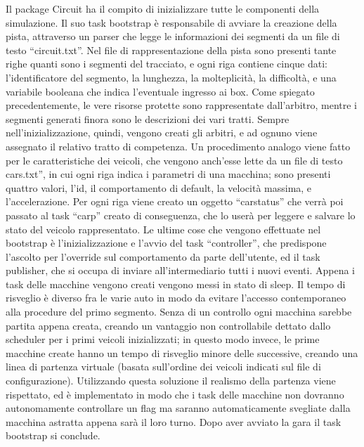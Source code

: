 Il package Circuit ha il compito di inizializzare tutte le componenti della simulazione. 
Il suo task bootstrap è responsabile di avviare la creazione della pista, attraverso un parser che legge le informazioni dei segmenti da un file di testo “circuit.txt”. Nel file di rappresentazione della pista sono presenti tante righe quanti sono i segmenti del tracciato, e ogni riga contiene cinque dati: l’identificatore del segmento, la lunghezza, la molteplicità, la difficoltà, e una variabile booleana che indica l’eventuale ingresso ai box.
Come spiegato precedentemente, le vere risorse protette sono rappresentate dall’arbitro, mentre i segmenti generati finora sono le descrizioni dei vari tratti. Sempre nell’inizializzazione, quindi, vengono creati gli arbitri, e ad ognuno viene assegnato il relativo tratto di competenza.
Un procedimento analogo viene fatto per le caratteristiche dei veicoli, che vengono anch’esse lette da un file di testo cars.txt”, in cui ogni riga indica i parametri di una macchina; sono presenti quattro valori, l’id, il comportamento di default, la velocità massima, e l’accelerazione.
Per ogni riga viene creato un oggetto ``car\textunderscore status'' che verrà poi passato al task ``car\textunderscore p'' creato di conseguenza, che lo userà per leggere e salvare lo stato del veicolo rappresentato.
Le ultime cose che vengono effettuate nel bootstrap è l’inizializzazione e l’avvio del task “controller”, che predispone l’ascolto per l’override sul comportamento da parte dell’utente, ed il task publisher, che si occupa di inviare all’intermediario tutti i nuovi eventi.
Appena i task delle macchine vengono creati vengono messi in stato di sleep. Il tempo di risveglio è diverso fra le varie auto in modo da evitare l'accesso contemporaneo alla procedure del primo segmento. Senza di un controllo ogni macchina sarebbe partita appena creata, creando un vantaggio non controllabile dettato dallo scheduler per i primi veicoli inizializzati; in questo modo invece, le prime macchine create hanno un tempo di risveglio minore delle successive, creando una linea di partenza virtuale (basata sull’ordine dei veicoli indicati sul file di configurazione). Utilizzando questa soluzione il realismo della partenza viene rispettato, ed è implementato in modo che i task delle macchine non dovranno autonomamente controllare un flag ma saranno automaticamente svegliate dalla macchina astratta appena sarà il loro turno.
Dopo aver avviato la gara il task bootstrap si conclude. \\
